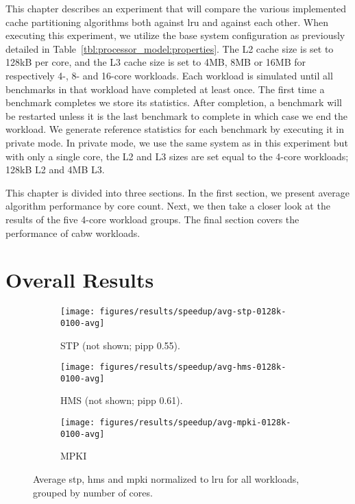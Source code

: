 This chapter describes an experiment that will compare the various implemented cache partitioning algorithms both against \gls{lru} and against each other.
When executing this experiment, we utilize the base system configuration as previously detailed in Table~\ref{tbl:processor_model:properties}.
The L2 cache size is set to 128kB per core, and the L3 cache size is set to 4MB, 8MB or 16MB for respectively 4-, 8- and 16-core workloads.
Each workload is simulated until all benchmarks in that workload have completed at least once. 
The first time a benchmark completes we store its statistics.
After completion, a benchmark will be restarted unless it is the last benchmark to complete in which case we end the workload.
We generate reference statistics for each benchmark by executing it in private mode.
In private mode, we use the same system as in this experiment but with only a single core, the L2 and L3 sizes are set equal to the 4-core workloads; 128kB L2 and 4MB L3.

This chapter is divided into three sections.
In the first section, we present average algorithm performance by core count.
Next, we then take a closer look at the results of the five 4-core workload groups.
The final section covers the performance of cabw workloads.

\section{Overall Results}
\label{sec:results:cache_partition}

\begin{figure}[th]
    \centering
    \begin{subfigure}[b]{0.5\textwidth}
        \texttt{[image: figures/results/speedup/avg-stp-0128k-0100-avg]}
        \caption{STP (not shown; \gls{pipp} 0.55).}
        \label{fig:results:base:avg:stp}
    \end{subfigure}%
    \begin{subfigure}[b]{0.5\textwidth}
        \texttt{[image: figures/results/speedup/avg-hms-0128k-0100-avg]}
        \caption{HMS (not shown; \gls{pipp} 0.61).}
        \label{fig:results:base:avg:hms}
    \end{subfigure}
    \begin{subfigure}[b]{0.5\textwidth}
        \texttt{[image: figures/results/speedup/avg-mpki-0128k-0100-avg]}
        \caption{MPKI}
        \label{fig:results:base:avg:mpki}
    \end{subfigure}
    \caption[Average result grouped by core]{Average \gls{stp}, \gls{hms} and \gls{mpki} normalized to \gls{lru} for all workloads, grouped by number of cores.}
    \label{fig:results:base:avg}
\end{figure}



